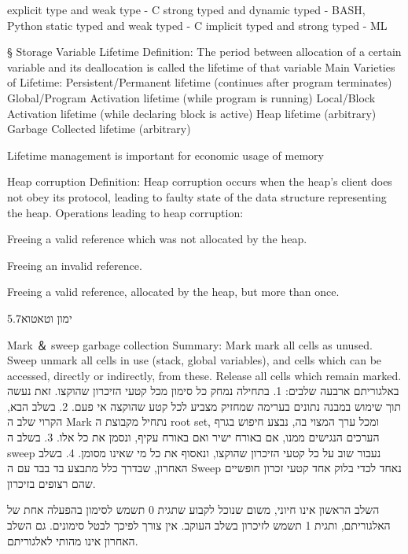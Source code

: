 \begin{טבלא}[!htbp]
        explicit type and weak type - C
        strong typed and dynamic typed - BASH, Python
        static typed and weak typed - C
        implicit typed and strong typed - ML

§ Storage
        Variable Lifetime
        Definition:
        The period between allocation of a certain variable and its deallocation is called the lifetime of that variable
        Main Varieties of Lifetime:
        Persistent/Permanent lifetime (continues after program terminates)
        Global/Program Activation lifetime (while program is running)
        Local/Block Activation lifetime (while declaring block is active)
        Heap lifetime (arbitrary)
        Garbage Collected lifetime (arbitrary)

        Lifetime management is important for economic usage of memory

        Heap corruption
        Definition:
        Heap corruption occurs when the heap’s client does not obey its protocol, leading to faulty state of the data structure representing the heap.
        Operations leading to heap corruption:
          \item Freeing a valid reference which was not allocated by the heap.
          \item Freeing an invalid reference.
          \item Freeing a valid reference, allocated by the heap,
          but more than once.

        5.7ימון וטאטוא

        Mark ＆ sweep garbage collection
        Summary:
        Mark mark all cells as unused.
        Sweep unmark all cells in use (stack, global variables), and cells which can be accessed, directly or indirectly, from these.
        Release all cells which remain marked.
        באלגוריתם ארבעה שלבים:
        1. בתחילה נמחק כל סימון מכל קטעי הזיכרון שהוקצו. זאת נעשה תוך שימוש במבנה נתונים בערימה שמחזיק מצביע לכל קטע שהוקצה אי פעם.
        2. בשלב הבא, הקרוי שלב ה Mark נתחיל מקבוצת ה root set, ומכל ערך המצוי בה, נבצע חיפוש בגרף הערכים הנגישים ממנו, אם באורח ישיר ואם באורח עקיף, ונסמן את כל אלו.
        3. בשלב ה sweep נעבור שוב על כל קטעי הזיכרון שהוקצו, ונאסוף את כל מי שאינו מסומן.
        4. בשלב האחרון, שבדרך כלל מתבצע בד בבד עם ה Sweep נאחד לכדי בלוק אחד קטעי זכרון חופשיים שהם רצופים בזיכרון.

        השלב הראשון אינו חיוני, משום שנוכל לקבוע שתגית 0 תשמש לסימון בהפעלה אחת של האלגוריתם, ותגית 1 תשמש לזיכרון בשלב העוקב. אין צורך לפיכך לבטל סימונים. גם השלב האחרון אינו מהותי לאלגוריתם.


\end{טבלא}
